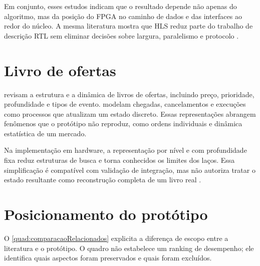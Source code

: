 Em conjunto, esses estudos indicam que o resultado depende não apenas do algoritmo, mas da posição do FPGA no caminho de dados e das interfaces ao redor do núcleo. A mesma literatura mostra que HLS reduz parte do trabalho de descrição RTL sem eliminar decisões sobre largura, paralelismo e protocolo \cite{Leber2011,Lockwood2012,Boutros2017}.

\section{Livro de ofertas}\label{sec:relacionadosLivro}

 revisam a estrutura e a dinâmica de livros de ofertas, incluindo preço, prioridade, profundidade e tipos de evento.  modelam chegadas, cancelamentos e execuções como processos que atualizam um estado discreto. Essas representações abrangem fenômenos que o protótipo não reproduz, como ordens individuais e dinâmica estatística de um mercado.

Na implementação em hardware, a representação por nível e com profundidade fixa reduz estruturas de busca e torna conhecidos os limites dos laços. Essa simplificação é compatível com validação de integração, mas não autoriza tratar o estado resultante como reconstrução completa de um livro real \cite{Gould2013,Boutros2017}.

\section{Posicionamento do protótipo}\label{sec:posicionamento}

O \autoref{quad:comparacaoRelacionados} explicita a diferença de escopo entre a literatura e o protótipo. O quadro não estabelece um ranking de desempenho; ele identifica quais aspectos foram preservados e quais foram excluídos.

